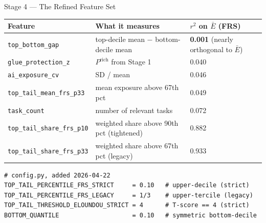\documentclass[10pt,english,aspectratio=169]{beamer}
\begin{document}
\begin{frame}[fragile]{Stage 4 --- The Refined Feature Set}
\scriptsize
\begin{tabular}{p{3.1cm}p{3.8cm}p{5.0cm}}
\toprule
\textbf{Feature} & \textbf{What it measures} & \textbf{$r^2$ on $\bar E$ (FRS)} \\
\midrule
\texttt{top\_bottom\_gap} & top-decile mean $-$ bottom-decile mean & \textbf{0.001} (nearly orthogonal to $\bar E$) \\
\texttt{glue\_protection\_z} & $P^{\text{rich}}$ from Stage 1 & 0.040 \\
\texttt{ai\_exposure\_cv} & SD / mean & 0.046 \\
\texttt{top\_tail\_mean\_frs\_p33} & mean exposure above 67th pct & 0.049 \\
\texttt{task\_count} & number of relevant tasks & 0.072 \\
\texttt{top\_tail\_share\_frs\_p10} & weighted share above 90th pct (tightened) & 0.882 \\
\texttt{top\_tail\_share\_frs\_p33} & weighted share above 67th pct (legacy) & 0.933 \\
\bottomrule
\end{tabular}

\vspace{0.2cm}
\begin{tcolorbox}[colback=gray!5,colframe=gray!40]
\begin{lstlisting}[style=pythonstyle,numbers=none,basicstyle=\ttfamily\scriptsize]
# config.py, added 2026-04-22
TOP_TAIL_PERCENTILE_FRS_STRICT     = 0.10   # upper-decile (strict)
TOP_TAIL_PERCENTILE_FRS_LEGACY     = 1/3    # upper-tercile (legacy)
TOP_TAIL_THRESHOLD_ELOUNDOU_STRICT = 4      # T-score == 4 (strict)
BOTTOM_QUANTILE                    = 0.10   # symmetric bottom-decile
\end{lstlisting}
\end{tcolorbox}
\end{frame}
\end{document}
